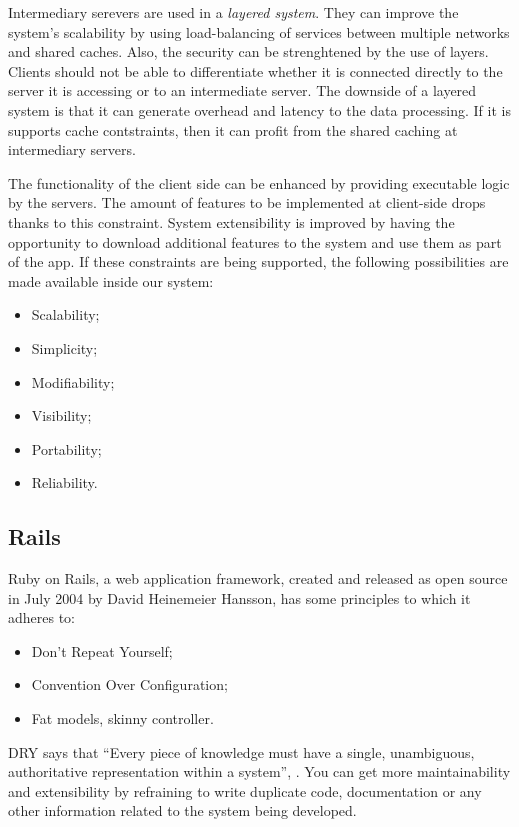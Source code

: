 Intermediary serevers are used in a \textit{layered system}. They can improve the system's scalability by using load-balancing of services between multiple networks and shared caches. Also, the security can be strenghtened by the use of layers. Clients should not be able to differentiate whether it is connected directly to the server it is accessing or to an intermediate server.
The downside of a layered system is that it can generate overhead and latency to the data processing. If it is supports cache contstraints, then it can profit from the shared caching at intermediary servers.

The functionality of the client side can be enhanced by providing executable logic by the servers. The amount of features to be implemented at client-side drops thanks to this constraint. System extensibility is improved by having the opportunity to download additional features to the system and use them as part of the app. If these constraints are being supported, the following possibilities are made available inside our system:
\begin{itemize} 
  \item Scalability;
  \item Simplicity;
  \item Modifiability;
  \item Visibility;
  \item Portability;
  \item Reliability.
\end{itemize}


\subsection{Rails}

Ruby on Rails, a web application framework, created and released as open source in July 2004 by David Heinemeier Hansson, has some principles to which it adheres to:
\begin{itemize}
  \item Don't Repeat Yourself;
  \item Convention Over Configuration;
  \item Fat models, skinny controller.
\end{itemize}

DRY says that ``Every piece of knowledge must have a single, unambiguous, authoritative representation within a system'', \cite{dry_principle}. You can get more maintainability and extensibility by refraining to write duplicate code, documentation or any other information related to the system being developed. 

